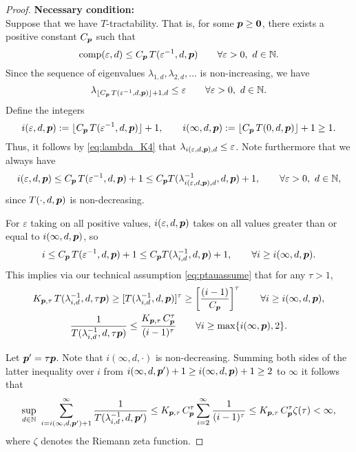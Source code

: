 \documentclass[11pt,a4paper]{article}
\begin{document}
\begin{proof}
\noindent \textbf{Necessary condition:}\\
Suppose that we have
$T$-tractability. That is, for some $\boldsymbol{p} \ge \boldsymbol{0}$, there exists a positive constant $C_{\boldsymbol{p}}$ such that
\[
\operatorname{comp}(\varepsilon,d)\le C_{\boldsymbol{p}}\, T(\varepsilon^{-1},d,\boldsymbol{p}) \qquad \forall \varepsilon > 0,  \ d \in \mathbb{N}.
\]
Since the sequence of eigenvalues $\lambda_{1,d}, \lambda_{2,d}, \ldots $ is non-increasing, we have
\begin{equation}\label{eq:lambda_K4}
	\lambda_{\lfloor C_{\boldsymbol{p}}\, T(\varepsilon^{-1},d,\boldsymbol{p})\rfloor +1,d}\le \varepsilon \qquad \forall \varepsilon > 0,  \ d \in \mathbb{N}.
\end{equation}
Define the integers
\[
i (\varepsilon,d,\boldsymbol{p}):= \lfloor C_{\boldsymbol{p}}\, T(\varepsilon^{-1},d,\boldsymbol{p})\rfloor +1, \qquad
i (\infty,d,\boldsymbol{p}) := \lfloor C_{\boldsymbol{p}}\, T(0,d,\boldsymbol{p})\rfloor +1 \ge 1.
\]
Thus, it follows by \eqref{eq:lambda_K4} that $\lambda_{i(\varepsilon,d,\boldsymbol{p}),d} \le \varepsilon$.
Note furthermore that we always have
\[
i(\varepsilon,d,\boldsymbol{p})\le C_{\boldsymbol{p}}\, T(\varepsilon^{-1},d,\boldsymbol{p})+1 \le C_{\boldsymbol{p}} T(\lambda_{i(\varepsilon,d,\boldsymbol{p}),d}^{-1},d,\boldsymbol{p})+1, \qquad \forall \varepsilon > 0, \ d \in \mathbb{N},
\]
since
$T(\cdot,d,\boldsymbol{p})$ is non-decreasing.

For $\varepsilon$ taking on all positive values, $i(\varepsilon,d,\boldsymbol{p})$ takes on all values greater than or equal to $i(\infty,d,\boldsymbol{p})$, so
\[
i\le C_{\boldsymbol{p}}\, T(\varepsilon^{-1},d,\boldsymbol{p})+1 \le C_{\boldsymbol{p}} T(\lambda_{i,d}^{-1},d,\boldsymbol{p})+1, \qquad \forall i \ge i(\infty,d,\boldsymbol{p}).
\]
This implies via our technical assumption \eqref{eq:ptauassume} that for any $\tau > 1$,
\begin{gather*}
	K_{\boldsymbol{p},\tau}\,T (\lambda_{i,d}^{-1},d,\tau \boldsymbol{p}) \ge
	[T(\lambda_{i,d}^{-1},d, \boldsymbol{p})]^\tau
	\ge
	\left[\frac{(i-1)}{C_{\boldsymbol{p}}}\right]^\tau \qquad \forall i \ge i(\infty,d,\boldsymbol{p}), \\
	 \frac{1}{T (\lambda_{i,d}^{-1},d,\tau \boldsymbol{p})} \le
	\frac{K_{\boldsymbol{p},\tau}\, C_{\boldsymbol{p}}^\tau}{(i-1)^\tau}\qquad \forall i \ge \max\{i(\infty,\boldsymbol{p}),2\}.
\end{gather*}

Let $\boldsymbol{p}' = \tau \boldsymbol{p}$.  Note that $i(\infty,d,\cdot)$ is non-decreasing.  Summing both sides of the latter inequality over $i$ from $i(\infty,d,\boldsymbol{p}') + 1 \ge i(\infty,d, \boldsymbol{p}) + 1 \ge 2$ to $\infty$ it follows that
\begin{equation*}
	\sup_{d\in\mathbb{N}} \, \, \sum_{i=i (\infty,d,\boldsymbol{p}')+1}^\infty \frac{1}{T (\lambda_{i,d}^{-1},d,\boldsymbol{p}')}
	 \le  K_{\boldsymbol{p},\tau}\, C_{\boldsymbol{p}}^\tau
	\sum_{i=2}^\infty \frac{1}{(i-1)^\tau} \\
	 \le  K_{\boldsymbol{p},\tau}\, C_{\boldsymbol{p}}^\tau
	\zeta (\tau)  < \infty,
\end{equation*}
where $\zeta$ denotes the Riemann zeta function.



\end{proof}
\end{document}
